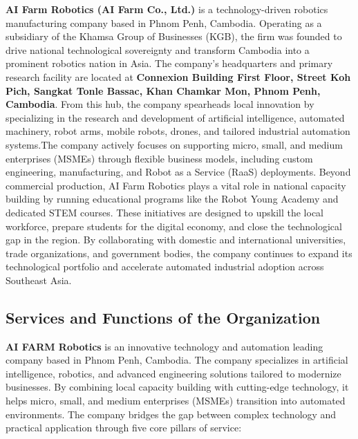 \hs \textbf{AI Farm Robotics (AI Farm Co., Ltd.)} is a technology-driven robotics manufacturing company based in Phnom Penh, Cambodia. Operating as a subsidiary of the Khamsa Group of Businesses (KGB), the firm was founded to drive national technological sovereignty and transform Cambodia into a prominent robotics nation in Asia. The company's headquarters and primary research facility are located at \textbf{Connexion Building First Floor, Street Koh Pich, Sangkat Tonle Bassac, Khan Chamkar Mon, Phnom Penh, Cambodia}. From this hub, the company spearheads local innovation by specializing in the research and development of artificial intelligence, automated machinery, robot arms, mobile robots, drones, and tailored industrial automation systems.The company actively focuses on supporting micro, small, and medium enterprises (MSMEs) through flexible business models, including custom engineering, manufacturing, and Robot as a Service (RaaS) deployments. Beyond commercial production, AI Farm Robotics plays a vital role in national capacity building by running educational programs like the Robot Young Academy and dedicated STEM courses. These initiatives are designed to upskill the local workforce, prepare students for the digital economy, and close the technological gap in the region. By collaborating with domestic and international universities, trade organizations, and government bodies, the company continues to expand its technological portfolio and accelerate automated industrial adoption across Southeast Asia.

\subsection{Services and Functions of the Organization}
\label{subsec:services_and_functions_of_the_organization}
\hs \textbf{AI FARM Robotics} is an innovative technology and automation leading company based in Phnom Penh, Cambodia. The company specializes in artificial intelligence, robotics, and advanced engineering solutions tailored to modernize businesses. By combining local capacity building with cutting-edge technology, it helps micro, small, and medium enterprises (MSMEs) transition into automated environments. The company bridges the gap between complex technology and practical application through five core pillars of service:

